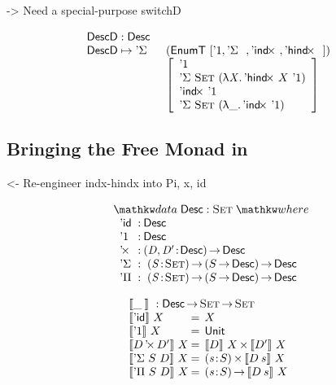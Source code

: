 \documentclass[preprint, authoryear, onecolumn]{sigplanconf}
\newenvironment{structure}{\footnotesize\verbatim}{\endverbatim}
\begin{document}
\begin{structure}
    -> Need a special-purpose switchD
\end{structure}


\[\stk{
\DescD : \Desc \\
\begin{array}{@{}ll}
\DescD \mapsto \DSigma{}{} & (\EnumT [ \DUnit, \DSigma{}{}, \DIndx{}, \DHindx{}{} ]) \\
                           & \left[\begin{array}{l}
                                   \DUnit                                \\
                                   \DSigma{\Set}{(\LAM{\V{X}} \DHindx{X}{\DUnit})} \\
                                   \DIndx{\DUnit}                                  \\
                                   \DSigma{\Set}{(\LAM{\_} \DIndx{\DUnit})}
                                   \end{array}
                             \right]
\end{array}
}
\]

\subsection{Bringing the Free Monad in}

\begin{structure}
<- Re-engineer indx-hindx into Pi, x, id
\end{structure}

\[
\stk{
\data \Desc : \Set \where \\
\;\;\begin{array}{@{}l@{\::\:}l@{\quad}l}
    \DId            & \Desc                                   \\
    \DUnit          & \Desc                                   \\
    \DProd{}{}      & \PI{\V{D}, \V{D'}}{\Desc} \Desc         \\
    \DSigma         & \PI{\V{S}}{\Set} \PIS{S \To \Desc} \Desc \\
    \DPi            & \PI{\V{S}}{\Set} \PIS{S \To \Desc} \Desc 
\end{array}
}
\]

\[\stk{
\descop{\_\:}{} : \Desc \To \Set \To \Set \\
\begin{array}{@{}l@{\:=\:\:}ll}
\descop{\DId}{X}          &  X                                           \\
\descop{\DUnit}{X}        &  \Unit                                       \\
\descop{\DProd{D}{D'}}{X} &  \TIMES{\descop{D}{X}}{\descop{D'}{X}}       \\
\descop{\DSigma{S}{D}}{X} &  \SIGMA{\V{s}}{S} \descop{D\: s}{X}                \\
\descop{\DPi{S}{D}}{X}    &  \PI{\V{s}}{S} \descop{D\: s}{X}            
\end{array}
}\]
\end{document}
